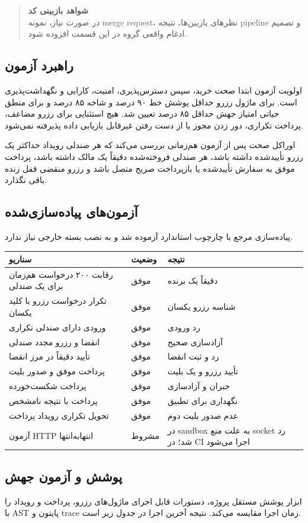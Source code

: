 \documentclass[12pt,a4paper]{article}
\newcommand{\term}[1]{\lr{#1}}
\newcommand{\reservedbox}[2]{%
    \begin{quote}
    \textbf{#1}\\[0.3em]
    #2
    \end{quote}
}
\begin{document}
\reservedbox{شواهد بازبینی کد}{در صورت نیاز، نمونه merge request، نظرهای
بازبین‌ها، نتیجه pipeline و تصمیم ادغام واقعی گروه در این قسمت افزوده شود.}

\subsection{راهبرد آزمون}
اولویت آزمون ابتدا صحت خرید، سپس دسترس‌پذیری، امنیت، کارایی و نگهداشت‌پذیری
است. برای ماژول رزرو حداقل پوشش خط ۹۰ درصد و شاخه ۸۵ درصد و برای منطق حیاتی
امتیاز جهش حداقل ۸۵ درصد تعیین شد. هیچ استثنایی برای رزرو مضاعف، پرداخت تکراری،
دور زدن مجوز یا از دست رفتن غیرقابل بازیابی داده پذیرفته نمی‌شود.

اوراکل صحت پس از آزمون هم‌زمانی بررسی می‌کند که هر صندلی رویداد حداکثر یک رزرو
تأییدشده داشته باشد، هر صندلی فروخته‌شده دقیقاً یک مالک داشته باشد، پرداخت موفق
به سفارش تأییدشده یا بازپرداخت صریح متصل باشد و رزرو منقضی قفل زنده باقی
نگذارد.

\subsection{آزمون‌های پیاده‌سازی‌شده}
پیاده‌سازی مرجع با چارچوب استاندارد \term{unittest} آزموده شد و به نصب بسته
خارجی نیاز ندارد.

\begin{longtable}{P{7.5cm}C{2.2cm}P{4.2cm}}
\toprule
سناریو & وضعیت & نتیجه\\
\midrule
رقابت ۲۰۰ درخواست هم‌زمان برای یک صندلی & موفق & دقیقاً یک برنده\\
تکرار درخواست رزرو با کلید یکسان & موفق & شناسه رزرو یکسان\\
ورودی دارای صندلی تکراری & موفق & رد ورودی\\
انقضا و رزرو مجدد صندلی & موفق & آزادسازی صحیح\\
تأیید دقیقاً در مرز انقضا & موفق & رد و ثبت انقضا\\
پرداخت موفق و صدور بلیت & موفق & تأیید رزرو و یک بلیت\\
پرداخت شکست‌خورده & موفق & جبران و آزادسازی\\
پرداخت با نتیجه نامشخص & موفق & نگهداری برای تطبیق\\
تحویل تکراری رویداد پرداخت & موفق & عدم صدور بلیت دوم\\
آزمون HTTP انتهابه‌انتها & مشروط & در sandbox به علت منع socket رد شد؛ در CI اجرا می‌شود\\
\bottomrule
\end{longtable}

\subsection{پوشش و آزمون جهش}
ابزار پوشش مستقل پروژه، دستورات قابل اجرای ماژول‌های رزرو، پرداخت و رویداد را
با AST پایتون و trace زمان اجرا مقایسه می‌کند. نتیجه آخرین اجرا در جدول زیر است.
\end{document}

